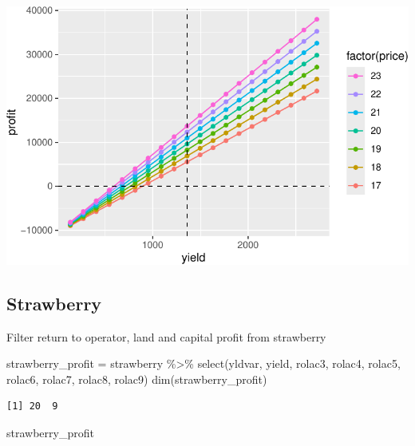 \documentclass[
  letterpaper,
  DIV=11,
  numbers=noendperiod]{scrartcl}
\newenvironment{Shaded}{\begin{snugshade}}{\end{snugshade}}
\newcommand{\FunctionTok}[1]{\textcolor[rgb]{0.28,0.35,0.67}{#1}}
\newcommand{\NormalTok}[1]{\textcolor[rgb]{0.00,0.23,0.31}{#1}}
\newcommand{\OtherTok}[1]{\textcolor[rgb]{0.00,0.23,0.31}{#1}}
\newcommand{\SpecialCharTok}[1]{\textcolor[rgb]{0.37,0.37,0.37}{#1}}
\begin{document}
\includegraphics{Simulation_files/figure-pdf/unnamed-chunk-29-1.pdf}

\subsection{Strawberry}\label{strawberry-1}

Filter return to operator, land and capital profit from strawberry

\begin{Shaded}
\begin{Highlighting}[]
\NormalTok{strawberry\_profit }\OtherTok{=}\NormalTok{ strawberry }\SpecialCharTok{\%\textgreater{}\%} 
  \FunctionTok{select}\NormalTok{(yldvar, yield, }
\NormalTok{         rolac3, rolac4, rolac5, rolac6, }
\NormalTok{         rolac7, rolac8, rolac9)}
\FunctionTok{dim}\NormalTok{(strawberry\_profit)}
\end{Highlighting}
\end{Shaded}

\begin{verbatim}
[1] 20  9
\end{verbatim}

\begin{Shaded}
\begin{Highlighting}[]
\NormalTok{strawberry\_profit}
\end{Highlighting}
\end{Shaded}
\end{document}
